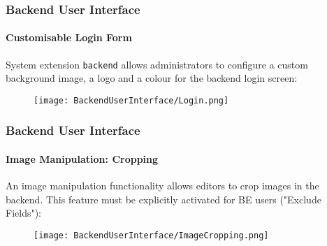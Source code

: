 %
\begin{frame}[fragile]
	\frametitle{Backend User Interface}
	\framesubtitle{Customisable Login Form}

	System extension \texttt{backend} allows administrators to configure a custom
	background image, a logo and a colour for the backend login screen:

	\begin{figure}
		\texttt{[image: BackendUserInterface/Login.png]}
	\end{figure}

\end{frame}

\begin{frame}[fragile]
	\frametitle{Backend User Interface}
	\framesubtitle{Image Manipulation: Cropping}

	An image manipulation functionality allows editors to crop images in the backend.
	This feature must be explicitly activated for BE users ("Exclude Fields"):

	\begin{figure}
		\texttt{[image: BackendUserInterface/ImageCropping.png]}
	\end{figure}

\end{frame}

